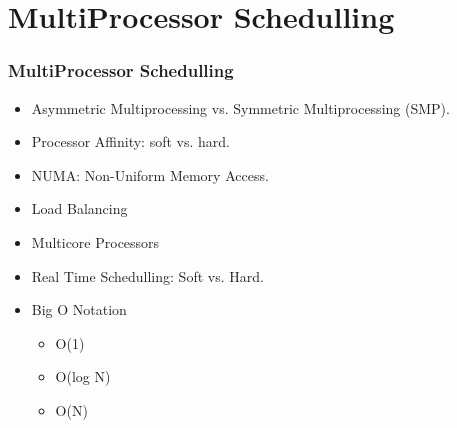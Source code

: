 \documentclass[aspectratio=169, xcolor=table, notheorems, hyperref={pdfpagelabels=false}]{beamer}
\begin{document}
\section{MultiProcessor Schedulling}
\begin{frame}
\frametitle{MultiProcessor Schedulling}
\begin{itemize}
\item Asymmetric Multiprocessing vs. Symmetric Multiprocessing (SMP).
\item Processor Affinity: soft vs. hard.
\item NUMA: Non-Uniform Memory Access.
\item Load Balancing
\item Multicore Processors
\item Real Time Schedulling: Soft vs. Hard.
\item Big O Notation
\begin{itemize}
\item O(1)
\item O(log N)
\item O(N)
\end{itemize}
\end{itemize}
\end{frame}

\end{document}
